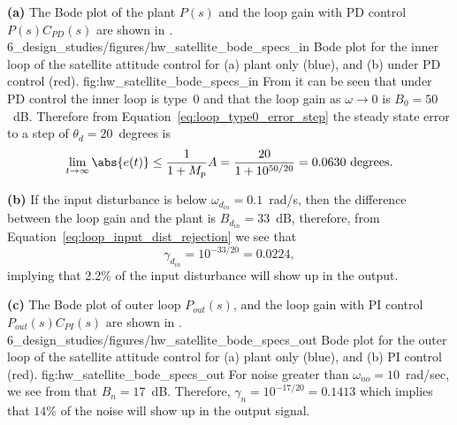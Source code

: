 
{\bf (a)} 
The Bode plot of the plant $P(s)$ and the loop     gain with PD control $P(s)C_{PD}(s)$ are shown in .
	{6_design_studies/figures/hw_satellite_bode_specs_in}
	{Bode plot for the inner loop of the satellite attitude control for (a) plant only (blue), and (b) under PD control (red).}
	{fig:hw_satellite_bode_specs_in}
From  it can be seen that under PD control the inner loop is type~0 and that the loop gain as $\omega\to 0$ is $B_0=50$~dB.  Therefore from Equation~\eqref{eq:loop_type0_error_step}  the steady state error to a step of $\theta_d = 20$~degrees is 
\[
\lim_{t\to\infty}\abs{e(t)} \leq \frac{1}{1+M_p} A = \frac{20}{1+10^{50/20}} = 0.0630\text{~degrees}.
\]

{\bf (b)} 
If the input disturbance is below $\omega_{d_{in}} = 0.1$~rad/s, then the difference between the loop gain and the plant is $B_{d_{in}}=33$~dB, therefore, from Equation~\eqref{eq:loop_input_dist_rejection} we see that 
\[
\gamma_{d_{in}} = 10^{-33/20} = 0.0224,
\]
implying that 2.2\% of the input disturbance will show up in the output.

{\bf (c)} 
The Bode plot of outer loop $P_{out}(s)$, and the loop gain with PI control $P_{out}(s)C_{PI}(s)$ are shown in .
	{6_design_studies/figures/hw_satellite_bode_specs_out}
	{Bode plot for the outer loop of the satellite attitude control for (a) plant only (blue), and (b) PI control (red).}
	{fig:hw_satellite_bode_specs_out}
For noise greater than $\omega_{no}=10$~rad/sec, we see from  that $B_n = 17$~dB.  Therefore, $\gamma_n = 10^{-17/20} = 0.1413$ which implies that $14$\% of the noise will show up in the output signal.
